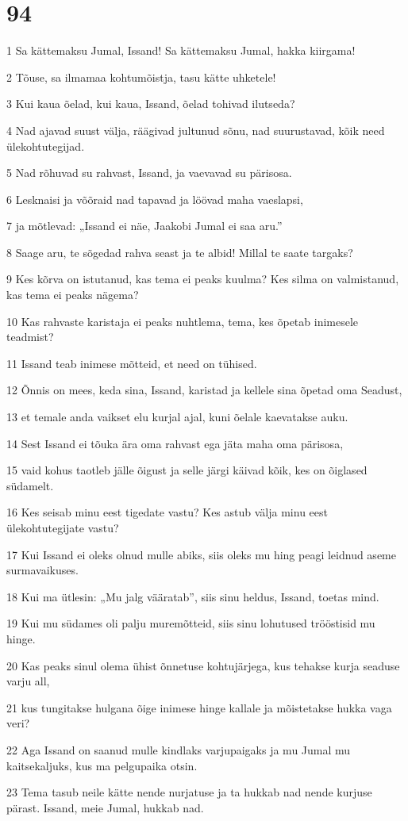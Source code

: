 \chapter{94}

\par 1 Sa kättemaksu Jumal, Issand! Sa kättemaksu Jumal, hakka kiirgama!
\par 2 Tõuse, sa ilmamaa kohtumõistja, tasu kätte uhketele!
\par 3 Kui kaua õelad, kui kaua, Issand, õelad tohivad ilutseda?
\par 4 Nad ajavad suust välja, räägivad jultunud sõnu, nad suurustavad, kõik need ülekohtutegijad.
\par 5 Nad rõhuvad su rahvast, Issand, ja vaevavad su pärisosa.
\par 6 Lesknaisi ja võõraid nad tapavad ja löövad maha vaeslapsi,
\par 7 ja mõtlevad: „Issand ei näe, Jaakobi Jumal ei saa aru.”
\par 8 Saage aru, te sõgedad rahva seast ja te albid! Millal te saate targaks?
\par 9 Kes kõrva on istutanud, kas tema ei peaks kuulma? Kes silma on valmistanud, kas tema ei peaks nägema?
\par 10 Kas rahvaste karistaja ei peaks nuhtlema, tema, kes õpetab inimesele teadmist?
\par 11 Issand teab inimese mõtteid, et need on tühised.
\par 12 Õnnis on mees, keda sina, Issand, karistad ja kellele sina õpetad oma Seadust,
\par 13 et temale anda vaikset elu kurjal ajal, kuni õelale kaevatakse auku.
\par 14 Sest Issand ei tõuka ära oma rahvast ega jäta maha oma pärisosa,
\par 15 vaid kohus taotleb jälle õigust ja selle järgi käivad kõik, kes on õiglased südamelt.
\par 16 Kes seisab minu eest tigedate vastu? Kes astub välja minu eest ülekohtutegijate vastu?
\par 17 Kui Issand ei oleks olnud mulle abiks, siis oleks mu hing peagi leidnud aseme surmavaikuses.
\par 18 Kui ma ütlesin: „Mu jalg vääratab”, siis sinu heldus, Issand, toetas mind.
\par 19 Kui mu südames oli palju muremõtteid, siis sinu lohutused trööstisid mu hinge.
\par 20 Kas peaks sinul olema ühist õnnetuse kohtujärjega, kus tehakse kurja seaduse varju all,
\par 21 kus tungitakse hulgana õige inimese hinge kallale ja mõistetakse hukka vaga veri?
\par 22 Aga Issand on saanud mulle kindlaks varjupaigaks ja mu Jumal mu kaitsekaljuks, kus ma pelgupaika otsin.
\par 23 Tema tasub neile kätte nende nurjatuse ja ta hukkab nad nende kurjuse pärast. Issand, meie Jumal, hukkab nad.

